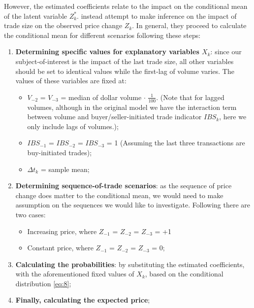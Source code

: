 However, the estimated coefficients relate to the impact on the conditional mean of the latent variable $Z_k^*$. \citet{hausman1992} instead attempt to make inference on the impact of trade size on the observed price change $Z_k$. In general, they proceed to calculate the conditional mean for different scenarios following these steps:
\begin{enumerate}
    \item \textbf{Determining specific values for explanatory variables $X_k$}: since our subject-of-interest is the impact of the last trade size, all other variables should be set to identical values while the first-lag of volume varies. The values of these variables are fixed at:
    \begin{itemize}
    \item $V_{-2}$ = $V_{-3}$ = median of dollar volume $\cdot$ $\frac{1}{100}$. 
    (Note that for lagged volumes, although in the original model we have the interaction term between volume and buyer/seller-initiated trade indicator $IBS_k$, here we only include lags of volumes.);
    \item $IBS_{-1}$ = $IBS_{-2}$ = $IBS_{-3}$ = 1 (Assuming the last three transactions are buy-initiated trades);
    \item $\Delta t_k$ = sample mean;
    \end{itemize}
    \item \textbf{Determining sequence-of-trade scenarios}: as the sequence of price change does matter to the conditional mean, we would need to make assumption on the sequences we would like to investigate. Following \citet{hausman1992} there are two cases:
    \begin{itemize}
    \item Increasing price, where $Z_{-1}$ = $Z_{-2}$ = $Z_{-3}$ = +1
    \item Constant price, where $Z_{-1}$ = $Z_{-2}$ = $Z_{-3}$ = 0;
    \end{itemize}
    \item \textbf{Calculating the probabilities}: by substituting the estimated coefficients, with the aforementioned fixed values of $X_k$, based on the conditional distribution \eqref{eq:8};
    \item \textbf{Finally, calculating the expected price};
\end{enumerate}

